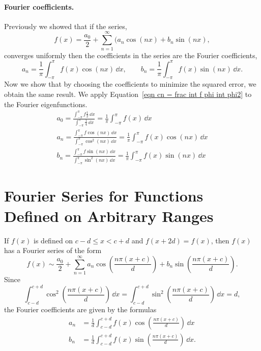 \paragraph{Fourier coefficients.}
Previously we showed that if the series,
\[ 
f(x) = \frac{a_0}{2} + \sum_{n=1}^\infty (a_n \cos(n x) + b_n \sin(n x),
\]
converges uniformly then the coefficients in the series are the Fourier 
coefficients,
\[ 
a_n = \frac{1}{\pi} \int_{-\pi}^\pi f(x) \cos(n x)\,\dd x, \qquad
b_n = \frac{1}{\pi} \int_{-\pi}^\pi f(x) \sin(n x)\,\dd x. 
\]
Now we show that by choosing the coefficients to minimize the squared error,
we obtain the same result.
We apply Equation~\ref{eqn cn = frac int f phi int phi2} to the Fourier
eigenfunctions.
\begin{gather*}
  a_0 = \frac{ \int_{-\pi}^\pi f \frac{1}{2} \,\dd x }{ \int_{-\pi}^\pi \frac{1}{4} \,\dd x }
  = \frac{1}{\pi} \int_{-\pi}^\pi f(x)\,\dd x
  \\
  a_n = \frac{ \int_{-\pi}^\pi f \cos(n x) \,\dd x }{ \int_{-\pi}^\pi \cos^2(n x) \,\dd x }
  = \frac{1}{\pi} \int_{-\pi}^\pi f(x) \cos(n x)\,\dd x
  \\
  b_n = \frac{ \int_{-\pi}^\pi f \sin(n x) \,\dd x }{ \int_{-\pi}^\pi \sin^2(n x) \,\dd x }
  = \frac{1}{\pi} \int_{-\pi}^\pi f(x) \sin(n x)\,\dd x
\end{gather*}













\section{Fourier Series for Functions Defined on Arbitrary Ranges}






If $f(x)$ is defined on $c-d \leq x < c+d$ and $f(x + 2d) = f(x)$, then
$f(x)$ has a Fourier series of the form
\[ f(x) \sim \frac{a_0}{2} + \sum_{n=1}^\infty 
a_n \cos\left( \frac{n \pi (x+c)}{d} \right)
+ b_n \sin \left( \frac{n \pi (x+c)}{d} \right) . \]
Since
\[ \int_{c-d}^{c+d} \cos^2 \left( \frac{n \pi (x+c)}{d} \right)\,\dd x = 
\int_{c-d}^{c+d} \sin^2 \left( \frac{n \pi (x+c)}{d} \right)\,\dd x = d,\] 
the Fourier coefficients are given by the formulas
\begin{align*}
  a_n &= \frac{1}{d} \int_{c-d}^{c+d} f(x) \cos \left(
    \frac{n \pi (x+c)}{d} \right)\,\dd x \\
  b_n &= \frac{1}{d} \int_{c-d}^{c+d} f(x) \sin \left(
    \frac{n \pi (x+c)}{d} \right)\,\dd x. 
\end{align*}






